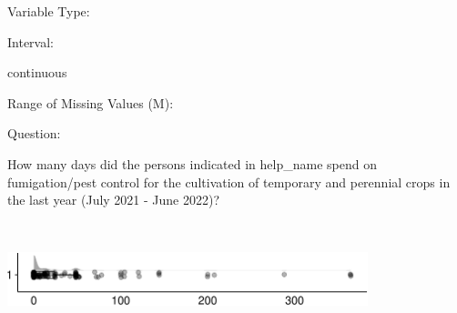 \documentclass[
]{article}
\begin{document}
\begin{minipage}[t]{0.3\linewidth}

Variable Type:

\end{minipage}%
\begin{minipage}[t]{0.7\linewidth}

\end{minipage}

\begin{minipage}[t]{0.3\linewidth}

Interval:

\end{minipage}%
\begin{minipage}[t]{0.7\linewidth}

continuous

\end{minipage}

\begin{minipage}[t]{0.3\linewidth}

Range of Missing Values (M):

\end{minipage}%
\begin{minipage}[t]{0.7\linewidth}

\end{minipage}

\begin{minipage}[t]{0.3\linewidth}

Question:

\end{minipage}%
\begin{minipage}[t]{0.7\linewidth}

How many days did the persons indicated in help\_name spend on
fumigation/pest control for the cultivation of temporary and perennial
crops in the last year (July 2021 - June 2022)?

\end{minipage}

\begin{minipage}[t]{0.3\linewidth}

~

\end{minipage}%
\begin{minipage}[t]{0.7\linewidth}

\includegraphics[width=396px]{codebook_template_files/figure-latex/q7_29_rainplot-1}

\end{minipage}
 \vspace*{-6mm} 
\end{document}
